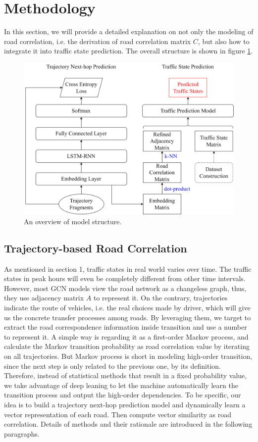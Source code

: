 
\section{Methodology}
In this section, we will provide a detailed explanation on not only the modeling of road correlation, i.e. the derivation of road correlation matrix $C$, but also how to integrate it into traffic state prediction. The overall structure is shown in figure \ref{fig: model}.

\begin{figure}[htb]
    \centering
    \includegraphics[width=\textwidth]{images/model.drawio.png}
    \caption{An overview of model structure.}
    \label{fig: model}
  \end{figure}

\subsection{Trajectory-based Road Correlation}
As mentioned in section 1, traffic states in real world varies over time. The traffic states in peak hours will even be completely different from other time intervals. However, most GCN models view the road network as a changeless graph, thus, they use adjacency matrix $A$ to represent it. On the contrary, trajectories indicate the route of vehicles, i.e. the real choices made by driver, which will give us the concrete transfer processes among roads. By leveraging them, we target to extract the road correspondence information inside transition and use a number to represent it. A simple way is regarding it as a first-order Markov process\cite{AAAI21}, and calculate the Markov transition probability as road correlation value by iterating on all trajectories. But Markov process is short in modeling high-order transition, since the next step is only related to the previous one, by its definition. Therefore, instead of statistical methods that result in a fixed probability value, we take advantage of deep leaning to let the machine automatically learn the transition process and output the high-order dependencies. To be specific, our idea is to build a trajectory next-hop prediction model and dynamically learn a vector representation of each road. Then compute vector similarity as road correlation. Details of methods and their rationale are introduced in the following paragraphs.

